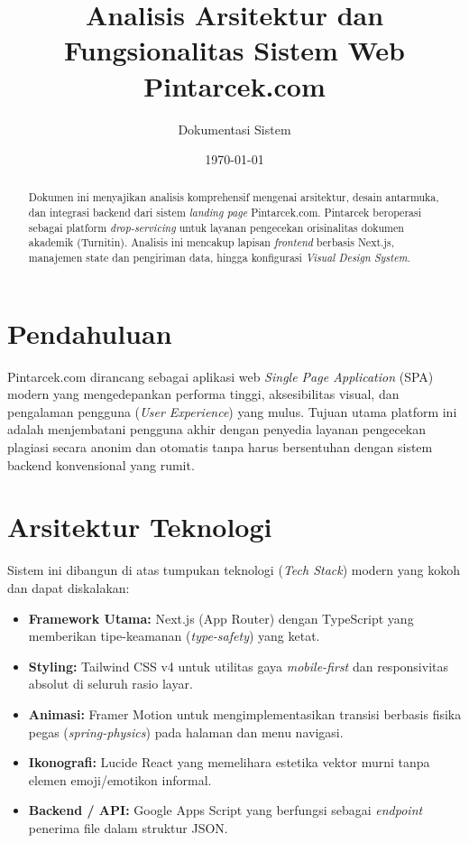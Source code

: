 \documentclass[12pt,a4paper]{article}
\title{Analisis Arsitektur dan Fungsionalitas Sistem Web \textbf{Pintarcek.com}}
\author{Dokumentasi Sistem}
\date{\today}
\begin{document}
\maketitle

\begin{abstract}
Dokumen ini menyajikan analisis komprehensif mengenai arsitektur, desain antarmuka, dan integrasi backend dari sistem \textit{landing page} Pintarcek.com. Pintarcek beroperasi sebagai platform \textit{drop-servicing} untuk layanan pengecekan orisinalitas dokumen akademik (Turnitin). Analisis ini mencakup lapisan \textit{frontend} berbasis Next.js, manajemen state dan pengiriman data, hingga konfigurasi \textit{Visual Design System}.
\end{abstract}

\section{Pendahuluan}
Pintarcek.com dirancang sebagai aplikasi web \textit{Single Page Application} (SPA) modern yang mengedepankan performa tinggi, aksesibilitas visual, dan pengalaman pengguna (\textit{User Experience}) yang mulus. Tujuan utama platform ini adalah menjembatani pengguna akhir dengan penyedia layanan pengecekan plagiasi secara anonim dan otomatis tanpa harus bersentuhan dengan sistem backend konvensional yang rumit.

\section{Arsitektur Teknologi}
Sistem ini dibangun di atas tumpukan teknologi (\textit{Tech Stack}) modern yang kokoh dan dapat diskalakan:
\begin{itemize}
    \item \textbf{Framework Utama:} Next.js (App Router) dengan TypeScript yang memberikan tipe-keamanan (\textit{type-safety}) yang ketat.
    \item \textbf{Styling:} Tailwind CSS v4 untuk utilitas gaya \textit{mobile-first} dan responsivitas absolut di seluruh rasio layar.
    \item \textbf{Animasi:} Framer Motion untuk mengimplementasikan transisi berbasis fisika pegas (\textit{spring-physics}) pada halaman dan menu navigasi.
    \item \textbf{Ikonografi:} Lucide React yang memelihara estetika vektor murni tanpa elemen emoji/emotikon informal.
    \item \textbf{Backend / API:} Google Apps Script yang berfungsi sebagai \textit{endpoint} penerima file dalam struktur JSON.
\end{itemize}
\end{document}
